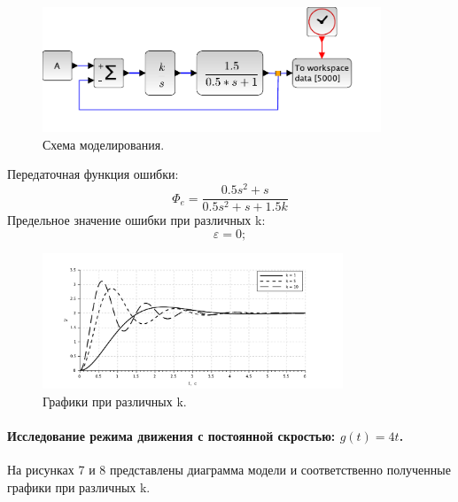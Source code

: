 \documentclass[a4paper, 11pt]{article}
\begin{document}
\begin{minipage}[t]{0.5\textwidth}
    \begin{figure}[H]
        \centering
        \includegraphics[width = 0.9\textwidth]{images/model2-1.pdf}
        \caption{Схема моделирования.}
    \end{figure}
\end{minipage}
\begin{minipage}[t]{0.5\textwidth}
    \vspace{0.5cm}
    Передаточная функция ошибки:
    \begin{equation}
        \Phi_e = \frac{0.5s^2 + s}{0.5s^2 + s + 1.5k}
    \end{equation}
    Предельное значение ошибки при различных k:
    \begin{equation*}
        \varepsilon = 0;
    \end{equation*}
\end{minipage}

\begin{figure}[h!]
    \centering
    \includegraphics[width = 0.8\textwidth]{images/graph2-1.pdf}
    \caption{Графики при различных k.}
\end{figure}

\newpage
\paragraph{Исследование режима движения с постоянной скростью: $g(t) = 4t$.} На рисунках 7 и 8 представлены диаграмма модели и соответственно полученные графики при различных k.
\end{document}
